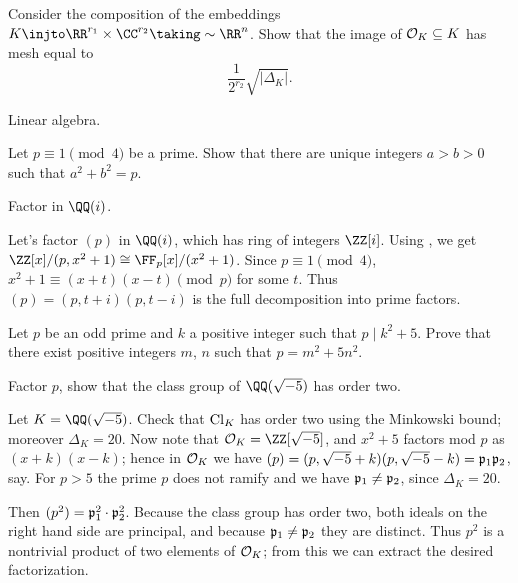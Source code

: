 \begin{problem} 
	\label{prob:OK_linalg}
	Consider the composition of the embeddings $K \injto \RR^{r_1} \times \CC^{r_2} \taking\sim \RR^n$.
	Show that the image of $\mathcal O_K \subseteq K$ has mesh equal to
	\[ \frac{1}{2^{r_2}} \sqrt{\left\lvert \Delta_K \right\rvert}. \]
	\begin{hint}
		Linear algebra.
	\end{hint}
\end{problem}

\begin{problem}
	Let $p \equiv 1 \pmod 4$ be a prime.
	Show that there are unique integers $a > b > 0$ such that $a^2+b^2=p$.
	\begin{hint}
		Factor in $\QQ(i)$.
	\end{hint}
	\begin{sol}
		Let's factor $(p)$ in $\QQ(i)$, which has ring of integers $\ZZ[i]$.
		Using , we get $\ZZ[x] / (p,x^2+1) \cong \FF_p[x] / (x^2+1)$.
		Since $p \equiv 1 \pmod 4$, $x^2+1 \equiv (x+t)(x-t) \pmod p$ for some $t$.
		Thus $(p) = (p, t+i)(p, t-i)$ is the full decomposition into prime factors.
	\end{sol}
\end{problem}


\begin{problem}
	[Korea 2014] 
	Let $p$ be an odd prime and $k$ a positive integer such that $p \mid k^2+5$.
	Prove that there exist positive integers $m$, $n$ such that $p = m^2+5n^2$.
	\begin{hint}
		Factor $p$, show that the class group of $\QQ(\sqrt{-5})$ has order two.
	\end{hint}
	\begin{sol}
		Let $K = \QQ(\sqrt{-5})$. Check that $\mathrm{Cl}_K$ has order two using the Minkowski bound;
		moreover $\Delta_K = 20$.
		Now note that $\OO_K = \ZZ[\sqrt{-5}]$, and $x^2+5$ factors mod $p$ as $(x+k)(x-k)$;
		hence in $\mathcal O_K$ we have $(p) = (p, \sqrt{-5}+k)(p, \sqrt{-5}-k) = \mathfrak p_1 \mathfrak p_2$, say.
		For $p > 5$ the prime $p$ does not ramify and we have $\mathfrak p_1 \neq \mathfrak p_2$, since $\Delta_K = 20$.

		Then $(p^2) = \mathfrak p_1^2 \cdot \mathfrak p_2^2$. Because the class group has order two,
		both ideals on the right hand side are principal, and because $\mathfrak p_1 \neq \mathfrak p_2$ they are distinct.
		Thus $p^2$ is a nontrivial product of two elements of $\mathcal O_K$; from this we can extract the desired factorization.
	\end{sol}
\end{problem}


